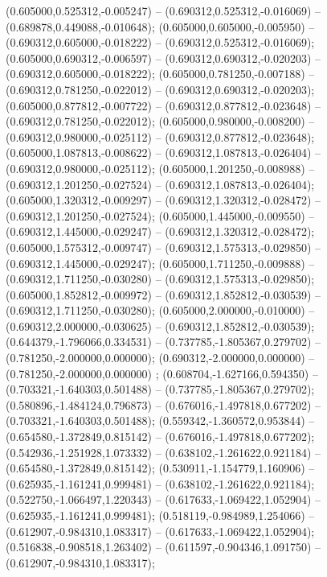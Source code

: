  (0.605000,0.525312,-0.005247) -- (0.690312,0.525312,-0.016069) -- (0.689878,0.449088,-0.010648);
 (0.605000,0.605000,-0.005950) -- (0.690312,0.605000,-0.018222) -- (0.690312,0.525312,-0.016069);
 (0.605000,0.690312,-0.006597) -- (0.690312,0.690312,-0.020203) -- (0.690312,0.605000,-0.018222);
 (0.605000,0.781250,-0.007188) -- (0.690312,0.781250,-0.022012) -- (0.690312,0.690312,-0.020203);
 (0.605000,0.877812,-0.007722) -- (0.690312,0.877812,-0.023648) -- (0.690312,0.781250,-0.022012);
 (0.605000,0.980000,-0.008200) -- (0.690312,0.980000,-0.025112) -- (0.690312,0.877812,-0.023648);
 (0.605000,1.087813,-0.008622) -- (0.690312,1.087813,-0.026404) -- (0.690312,0.980000,-0.025112);
 (0.605000,1.201250,-0.008988) -- (0.690312,1.201250,-0.027524) -- (0.690312,1.087813,-0.026404);
 (0.605000,1.320312,-0.009297) -- (0.690312,1.320312,-0.028472) -- (0.690312,1.201250,-0.027524);
 (0.605000,1.445000,-0.009550) -- (0.690312,1.445000,-0.029247) -- (0.690312,1.320312,-0.028472);
 (0.605000,1.575312,-0.009747) -- (0.690312,1.575313,-0.029850) -- (0.690312,1.445000,-0.029247);
 (0.605000,1.711250,-0.009888) -- (0.690312,1.711250,-0.030280) -- (0.690312,1.575313,-0.029850);
 (0.605000,1.852812,-0.009972) -- (0.690312,1.852812,-0.030539) -- (0.690312,1.711250,-0.030280);
 (0.605000,2.000000,-0.010000) -- (0.690312,2.000000,-0.030625) -- (0.690312,1.852812,-0.030539);
 (0.644379,-1.796066,0.334531) -- (0.737785,-1.805367,0.279702) -- (0.781250,-2.000000,0.000000);
 (0.690312,-2.000000,0.000000) -- (0.781250,-2.000000,0.000000) ;
 (0.608704,-1.627166,0.594350) -- (0.703321,-1.640303,0.501488) -- (0.737785,-1.805367,0.279702);
 (0.580896,-1.484124,0.796873) -- (0.676016,-1.497818,0.677202) -- (0.703321,-1.640303,0.501488);
 (0.559342,-1.360572,0.953844) -- (0.654580,-1.372849,0.815142) -- (0.676016,-1.497818,0.677202);
 (0.542936,-1.251928,1.073332) -- (0.638102,-1.261622,0.921184) -- (0.654580,-1.372849,0.815142);
 (0.530911,-1.154779,1.160906) -- (0.625935,-1.161241,0.999481) -- (0.638102,-1.261622,0.921184);
 (0.522750,-1.066497,1.220343) -- (0.617633,-1.069422,1.052904) -- (0.625935,-1.161241,0.999481);
 (0.518119,-0.984989,1.254066) -- (0.612907,-0.984310,1.083317) -- (0.617633,-1.069422,1.052904);
 (0.516838,-0.908518,1.263402) -- (0.611597,-0.904346,1.091750) -- (0.612907,-0.984310,1.083317);
